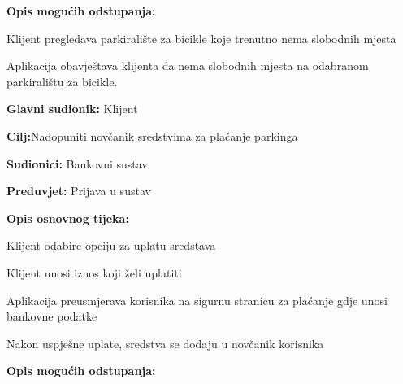 {\begin{packed_item}
\begin{packed_enum}
	\end{packed_enum}
	
	\item  \textbf{Opis mogućih odstupanja:}
	
	\item[] \begin{packed_item}
		
		\item[2.a] Klijent pregledava parkiralište za bicikle koje trenutno nema slobodnih mjesta
		\item[] \begin{packed_enum}
			
			\item Aplikacija obavještava klijenta da nema slobodnih mjesta na odabranom parkiralištu za bicikle.
			
		\end{packed_enum}
		
	\end{packed_item}
	
\end{packed_item}

\noindent {}
\begin{packed_item}
	
	\item \textbf{Glavni sudionik: }Klijent
	\item  \textbf{Cilj:}Nadopuniti novčanik sredstvima za plaćanje parkinga
	\item  \textbf{Sudionici:} Bankovni sustav
	\item  \textbf{Preduvjet:} Prijava u sustav
	\item  \textbf{Opis osnovnog tijeka:}
	
	\item[] \begin{packed_enum}
		
		\item Klijent odabire opciju za uplatu sredstava
		\item Klijent unosi iznos koji želi uplatiti
		\item Aplikacija preusmjerava korisnika na sigurnu stranicu za plaćanje gdje unosi bankovne podatke
		\item Nakon uspješne uplate, sredstva se dodaju u novčanik korisnika
		
	\end{packed_enum}
	
	\item  \textbf{Opis mogućih odstupanja:}
	\item[] \begin{packed_item}
		

\end{packed_item}
\end{packed_item}}
